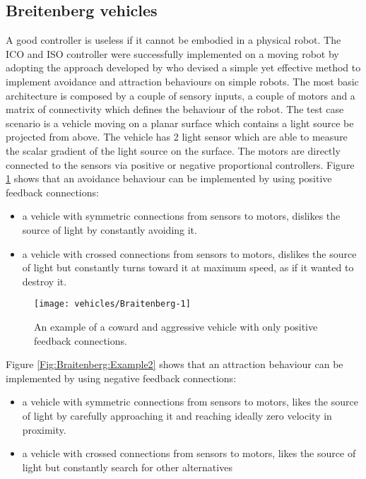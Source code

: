 \subsection{Breitenberg vehicles \label{Intro:Braitenberg}}

A good controller is useless if it cannot be embodied in a physical robot.
The ICO and ISO controller were successfully implemented on a moving robot by
 adopting the approach developed by \citet{Braitenberg1986} who devised a simple
 yet effective method to implement avoidance and attraction behaviours on 
simple robots.
The most basic architecture is composed by a couple of sensory inputs, a couple of motors
and a matrix of connectivity which defines the behaviour of the robot.
The test case scenario is a vehicle moving on a planar surface which contains a light source
 be projected from above.
The vehicle has 2 light sensor which are able to measure the scalar gradient of 
the light source on the surface.
The motors are directly connected to the sensors via positive or negative proportional 
controllers.
Figure \ref{Fig:Braitenberg:Example1} shows that an avoidance behaviour can be implemented
 by using positive feedback connections:

\begin{itemize}
 \item a vehicle with symmetric connections from sensors to motors, dislikes the source 
of light by constantly avoiding it.
 \item a vehicle with crossed connections from sensors to motors, dislikes the source of light
but constantly turns toward it at maximum speed, as if it wanted to destroy it.
\end{itemize}

\begin{figure}[htbp]
\begin{center}
\texttt{[image: vehicles/Braitenberg-1]}
\end{center}
\small{
\caption[Braitenberg vehicles positive feedback]{
An example of a coward and aggressive vehicle with only positive feedback connections.
\label{Fig:Braitenberg:Example1}}}
\end{figure}

Figure \ref{Fig:Braitenberg:Example2} shows that an attraction behaviour can be implemented
 by using negative feedback connections:
\begin{itemize}
 \item a vehicle with symmetric connections from sensors to motors, likes the source 
of light by carefully approaching it and reaching ideally zero velocity in proximity.
 \item a vehicle with crossed connections from sensors to motors, likes the source of light
but constantly search for other alternatives 
\end{itemize}

